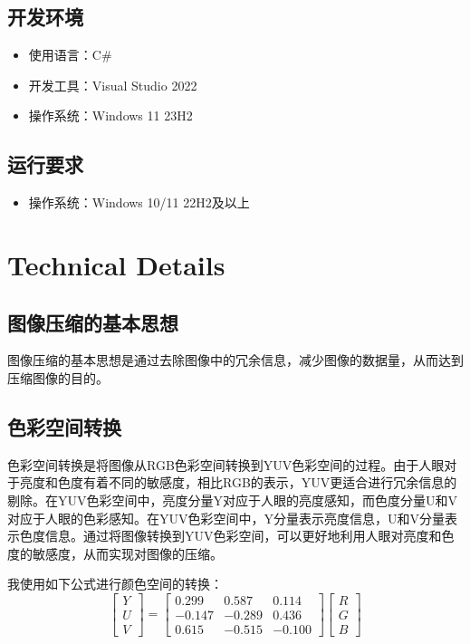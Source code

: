 \documentclass{article}
\begin{document}
\subsection{开发环境}

\begin{itemize}
    \item 使用语言：C\#
    \item 开发工具：Visual Studio 2022
    \item 操作系统：Windows 11 23H2
\end{itemize}

\subsection{运行要求}

\begin{itemize}
    \item 操作系统：Windows 10/11 22H2及以上
\end{itemize}

\section{Technical Details}

\subsection{图像压缩的基本思想}

图像压缩的基本思想是通过去除图像中的冗余信息，减少图像的数据量，从而达到压缩图像的目的。

\subsection{色彩空间转换}

色彩空间转换是将图像从RGB色彩空间转换到YUV色彩空间的过程。由于人眼对于亮度和色度有着不同的敏感度，相比RGB的表示，YUV更适合进行冗余信息的剔除。在YUV色彩空间中，亮度分量Y对应于人眼的亮度感知，而色度分量U和V对应于人眼的色彩感知。在YUV色彩空间中，Y分量表示亮度信息，U和V分量表示色度信息。通过将图像转换到YUV色彩空间，可以更好地利用人眼对亮度和色度的敏感度，从而实现对图像的压缩。

我使用如下公式进行颜色空间的转换：
\[
\begin{bmatrix}
    Y \\
    U \\
    V
\end{bmatrix}
=
\begin{bmatrix}
    0.299 & 0.587 & 0.114 \\
    -0.147 & -0.289 & 0.436 \\
    0.615 & -0.515 & -0.100
\end{bmatrix}
\begin{bmatrix}
    R \\
    G \\
    B
\end{bmatrix}    
\]
\end{document}
